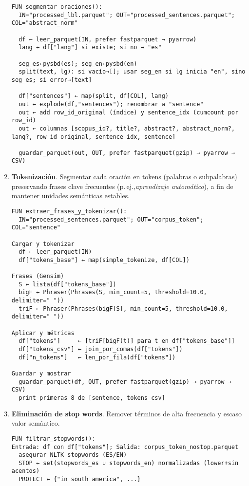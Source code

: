 \begin{enumerate}
\begin{verbatim}
FUN segmentar_oraciones():
  IN="processed_lbl.parquet"; OUT="processed_sentences.parquet"; COL="abstract_norm"

  df ← leer_parquet(IN, prefer fastparquet → pyarrow)
  lang ← df["lang"] si existe; si no → "es"

  seg_es←pysbd(es); seg_en←pysbd(en)
  split(text, lg): si vacío→[]; usar seg_en si lg inicia "en", sino seg_es; si error→[text]

  df["sentences"] ← map(split, df[COL], lang)
  out ← explode(df,"sentences"); renombrar a "sentence"
  out ← add row_id_original (índice) y sentence_idx (cumcount por row_id)
  out ← columnas [scopus_id?, title?, abstract?, abstract_norm?, lang?, row_id_original, sentence_idx, sentence]

  guardar_parquet(out, OUT, prefer fastparquet(gzip) → pyarrow → CSV)
\end{verbatim}

    \item \textbf{Tokenización}. Segmentar cada oración en tokens (palabras o subpalabras) preservando frases clave frecuentes (p.\,ej.,\textit{aprendizaje automático}), a fin de mantener unidades semánticas estables.
\begin{verbatim}
FUN extraer_frases_y_tokenizar():
  IN="processed_sentences.parquet"; OUT="corpus_token"; COL="sentence"

Cargar y tokenizar
  df ← leer_parquet(IN)                     
  df["tokens_base"] ← map(simple_tokenize, df[COL])

Frases (Gensim)
  S ← lista(df["tokens_base"])
  bigF ← Phraser(Phrases(S, min_count=5, threshold=10.0, delimiter=" "))
  triF ← Phraser(Phrases(bigF[S], min_count=5, threshold=10.0, delimiter=" "))

Aplicar y métricas
  df["tokens"]     ← [triF[bigF(t)] para t en df["tokens_base"]]
  df["tokens_csv"] ← join_por_comas(df["tokens"])
  df["n_tokens"]   ← len_por_fila(df["tokens"])

Guardar y mostrar
  guardar_parquet(df, OUT, prefer fastparquet(gzip) → pyarrow → CSV)
  print primeras 8 de [sentence, tokens_csv]
\end{verbatim}


    \item \textbf{Eliminación de stop words}. Remover términos de alta frecuencia y escaso valor semántico.
\begin{verbatim}
FUN filtrar_stopwords():
Entrada: df con df["tokens"]; Salida: corpus_token_nostop.parquet
  asegurar NLTK stopwords (ES/EN)
  STOP ← set(stopwords_es ∪ stopwords_en) normalizadas (lower+sin acentos)
  PROTECT ← {"in south america", ...}


\end{verbatim}
\end{enumerate}

